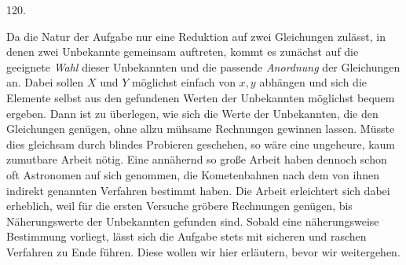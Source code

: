 \par{}\medskip
\begin{center}\hypertarget{native-166-article120}{}120.\end{center}
Da die Natur der Aufgabe nur eine Reduktion auf zwei Gleichungen zulässt, in denen zwei Unbekannte gemeinsam auftreten, kommt es zunächst auf die geeignete \emph{Wahl} dieser Unbekannten und die passende \emph{Anordnung} der Gleichungen an. Dabei sollen $X$ und $Y$ möglichst einfach von $x,y$ abhängen und sich die Elemente selbst aus den gefundenen Werten der Unbekannten möglichst bequem ergeben. Dann ist zu überlegen, wie sich die Werte der Unbekannten, die den Gleichungen genügen, ohne allzu mühsame Rechnungen gewinnen lassen. Müsste dies gleichsam durch blindes Probieren geschehen, so wäre eine ungeheure, kaum zumutbare Arbeit nötig. Eine annähernd so große Arbeit haben dennoch schon oft Astronomen auf sich genommen, die Kometenbahnen nach dem von ihnen indirekt genannten Verfahren bestimmt haben. Die Arbeit erleichtert sich dabei erheblich, weil für die ersten Versuche gröbere Rechnungen genügen, bis Näherungswerte der Unbekannten gefunden sind. Sobald eine näherungsweise Bestimmung vorliegt, lässt sich die Aufgabe stets mit sicheren und raschen Verfahren zu Ende führen. Diese wollen wir hier erläutern, bevor wir weitergehen.

